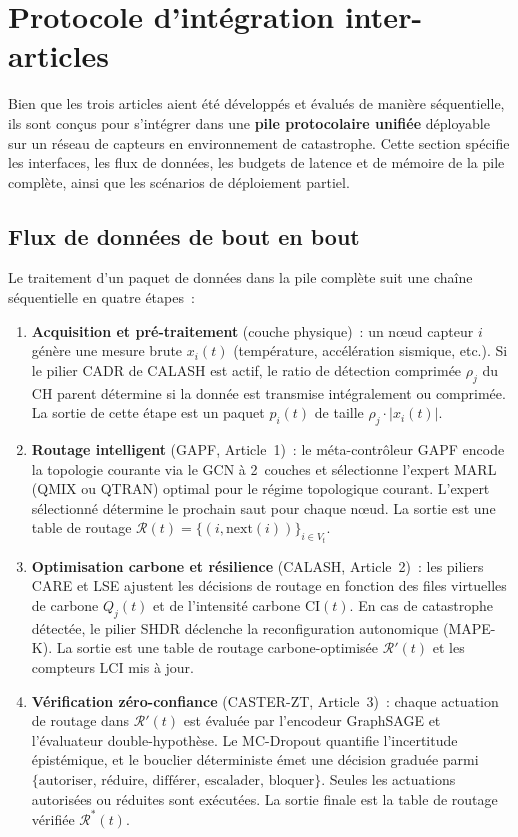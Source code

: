 \section{Protocole d'intégration inter-articles}\label{sec:demarche-integration}

Bien que les trois articles aient été développés et évalués de manière séquentielle, ils sont conçus pour s'intégrer dans une \textbf{pile protocolaire unifiée} déployable sur un réseau de capteurs en environnement de catastrophe. Cette section spécifie les interfaces, les flux de données, les budgets de latence et de mémoire de la pile complète, ainsi que les scénarios de déploiement partiel.

\subsection{Flux de données de bout en bout}

Le traitement d'un paquet de données dans la pile complète suit une chaîne séquentielle en quatre étapes~:

\begin{enumerate}
    \item \textbf{Acquisition et pré-traitement} (couche physique)~: un n\oe{}ud capteur $i$ génère une mesure brute $x_i(t)$ (température, accélération sismique, etc.). Si le pilier CADR de CALASH est actif, le ratio de détection comprimée $\rho_j$ du CH parent détermine si la donnée est transmise intégralement ou comprimée. La sortie de cette étape est un paquet $p_i(t)$ de taille $\rho_j \cdot |x_i(t)|$.
    \item \textbf{Routage intelligent} (GAPF, Article~1)~: le méta-contrôleur GAPF encode la topologie courante via le GCN à 2~couches et sélectionne l'expert MARL (QMIX ou QTRAN) optimal pour le régime topologique courant. L'expert sélectionné détermine le prochain saut pour chaque n\oe{}ud. La sortie est une table de routage $\mathcal{R}(t) = \{(i, \text{next}(i))\}_{i \in V_t}$.
    \item \textbf{Optimisation carbone et résilience} (CALASH, Article~2)~: les piliers CARE et LSE ajustent les décisions de routage en fonction des files virtuelles de carbone $Q_j(t)$ et de l'intensité carbone $\text{CI}(t)$. En cas de catastrophe détectée, le pilier SHDR déclenche la reconfiguration autonomique (MAPE-K). La sortie est une table de routage carbone-optimisée $\mathcal{R}'(t)$ et les compteurs LCI mis à jour.
    \item \textbf{Vérification zéro-confiance} (CASTER-ZT, Article~3)~: chaque actuation de routage dans $\mathcal{R}'(t)$ est évaluée par l'encodeur GraphSAGE et l'évaluateur double-hypothèse. Le MC-Dropout quantifie l'incertitude épistémique, et le bouclier déterministe émet une décision graduée parmi $\{\text{autoriser, réduire, différer, escalader, bloquer}\}$. Seules les actuations autorisées ou réduites sont exécutées. La sortie finale est la table de routage vérifiée $\mathcal{R}^*(t)$.
\end{enumerate}


